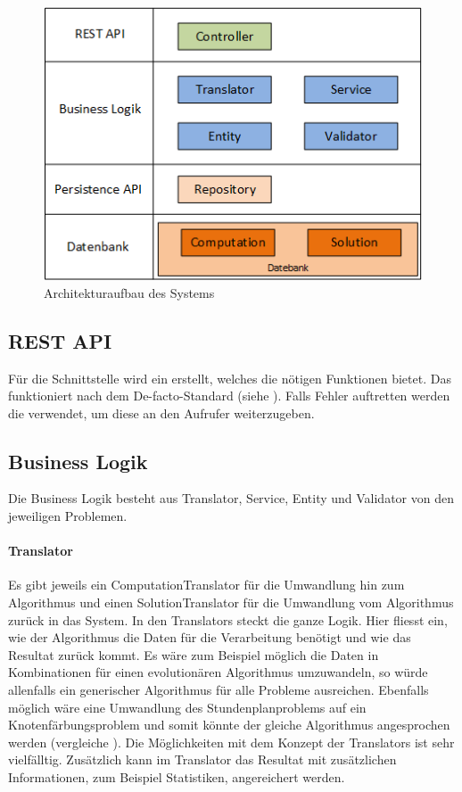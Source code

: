 \begin{figure}[h]
\centering
\includegraphics[scale=0.8]{images/visio/architektur_db.png}
\caption[Architekturaufbau des Systems]{Architekturaufbau des Systems \selfmade{}}
\label{fig:architektur}
\end{figure}
 
\FloatBarrier
\subsection{REST API}
Für die Schnittstelle wird ein   erstellt, welches die nötigen Funktionen bietet. Das  funktioniert nach dem De-facto-Standard 
(siehe \cite{wiki_restful}). Falls Fehler auftretten werden die  verwendet, um diese an den Aufrufer weiterzugeben.

\subsection{Business Logik}
Die Business Logik besteht aus Translator, Service, Entity und Validator von den jeweiligen Problemen. 
\paragraph{Translator}
Es gibt jeweils ein ComputationTranslator für die Umwandlung hin zum Algorithmus und einen SolutionTranslator für die Umwandlung vom Algorithmus zurück in das System. In den Translators steckt 
die ganze Logik. Hier fliesst ein, wie der Algorithmus die Daten für die Verarbeitung benötigt und wie das Resultat zurück kommt. Es wäre zum Beispiel möglich die Daten in Kombinationen 
für einen evolutionären Algorithmus umzuwandeln, so würde allenfalls ein generischer Algorithmus für alle Probleme ausreichen. Ebenfalls möglich wäre eine Umwandlung des 
Stundenplanproblems auf ein Knotenfärbungsproblem und somit könnte der gleiche Algorithmus angesprochen werden (vergleiche \cite{timetabling_abdullah}). Die Möglichkeiten mit dem 
Konzept der Translators ist sehr vielfälltig. Zusätzlich kann im Translator das Resultat mit zusätzlichen Informationen, zum Beispiel Statistiken, angereichert werden.

